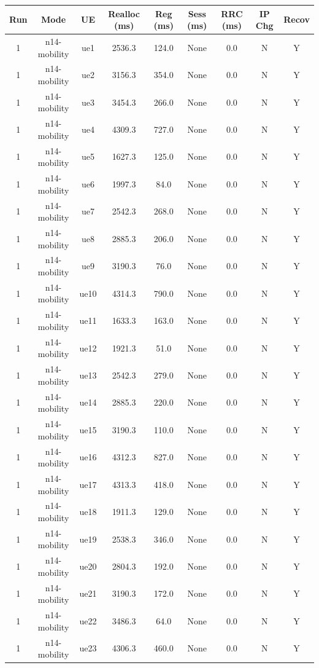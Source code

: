 \begin{table}[ht]
\centering
\begin{tabular}{|c|c|c|c|c|c|c|c|c|}
\hline
Run & Mode & UE & Realloc (ms) & Reg (ms) & Sess (ms) & RRC (ms) & IP Chg & Recov \\
\hline
1 & n14-mobility & ue1 & 2536.3 & 124.0 & None & 0.0 & N & Y \\
1 & n14-mobility & ue2 & 3156.3 & 354.0 & None & 0.0 & N & Y \\
1 & n14-mobility & ue3 & 3454.3 & 266.0 & None & 0.0 & N & Y \\
1 & n14-mobility & ue4 & 4309.3 & 727.0 & None & 0.0 & N & Y \\
1 & n14-mobility & ue5 & 1627.3 & 125.0 & None & 0.0 & N & Y \\
1 & n14-mobility & ue6 & 1997.3 & 84.0 & None & 0.0 & N & Y \\
1 & n14-mobility & ue7 & 2542.3 & 268.0 & None & 0.0 & N & Y \\
1 & n14-mobility & ue8 & 2885.3 & 206.0 & None & 0.0 & N & Y \\
1 & n14-mobility & ue9 & 3190.3 & 76.0 & None & 0.0 & N & Y \\
1 & n14-mobility & ue10 & 4314.3 & 790.0 & None & 0.0 & N & Y \\
1 & n14-mobility & ue11 & 1633.3 & 163.0 & None & 0.0 & N & Y \\
1 & n14-mobility & ue12 & 1921.3 & 51.0 & None & 0.0 & N & Y \\
1 & n14-mobility & ue13 & 2542.3 & 279.0 & None & 0.0 & N & Y \\
1 & n14-mobility & ue14 & 2885.3 & 220.0 & None & 0.0 & N & Y \\
1 & n14-mobility & ue15 & 3190.3 & 110.0 & None & 0.0 & N & Y \\
1 & n14-mobility & ue16 & 4312.3 & 827.0 & None & 0.0 & N & Y \\
1 & n14-mobility & ue17 & 4313.3 & 418.0 & None & 0.0 & N & Y \\
1 & n14-mobility & ue18 & 1911.3 & 129.0 & None & 0.0 & N & Y \\
1 & n14-mobility & ue19 & 2538.3 & 346.0 & None & 0.0 & N & Y \\
1 & n14-mobility & ue20 & 2804.3 & 192.0 & None & 0.0 & N & Y \\
1 & n14-mobility & ue21 & 3190.3 & 172.0 & None & 0.0 & N & Y \\
1 & n14-mobility & ue22 & 3486.3 & 64.0 & None & 0.0 & N & Y \\
1 & n14-mobility & ue23 & 4306.3 & 460.0 & None & 0.0 & N & Y \\

\end{tabular}
\end{table}
